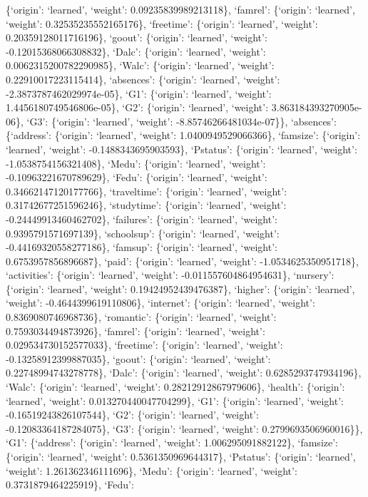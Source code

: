 \documentclass[
]{article}
\begin{document}
\{`origin': `learned', `weight': 0.09235839989213118\}, `famrel':
\{`origin': `learned', `weight': 0.32535235552165176\}, `freetime':
\{`origin': `learned', `weight': 0.20359128011716196\}, `goout':
\{`origin': `learned', `weight': -0.12015368066308832\}, `Dalc':
\{`origin': `learned', `weight': 0.0062315200782290985\}, `Walc':
\{`origin': `learned', `weight': 0.22910017223115414\}, `absences':
\{`origin': `learned', `weight': -2.3873787462029974e-05\}, `G1':
\{`origin': `learned', `weight': 1.4456180749546806e-05\}, `G2':
\{`origin': `learned', `weight': 3.863184393270905e-06\}, `G3':
\{`origin': `learned', `weight': -8.85746266481034e-07\}\}, `absences':
\{`address': \{`origin': `learned', `weight': 1.0400949529066366\},
`famsize': \{`origin': `learned', `weight': -0.1488343695903593\},
`Pstatus': \{`origin': `learned', `weight': -1.0538754156321408\},
`Medu': \{`origin': `learned', `weight': -0.10963221670789629\}, `Fedu':
\{`origin': `learned', `weight': 0.34662147120177766\}, `traveltime':
\{`origin': `learned', `weight': 0.31742677251596246\}, `studytime':
\{`origin': `learned', `weight': -0.24449913460462702\}, `failures':
\{`origin': `learned', `weight': 0.9395791571697139\}, `schoolsup':
\{`origin': `learned', `weight': -0.44169320558277186\}, `famsup':
\{`origin': `learned', `weight': 0.6753957856896687\}, `paid':
\{`origin': `learned', `weight': -1.0534625350951718\}, `activities':
\{`origin': `learned', `weight': -0.011557604864954631\}, `nursery':
\{`origin': `learned', `weight': 0.19424952439476387\}, `higher':
\{`origin': `learned', `weight': -0.4644399619110806\}, `internet':
\{`origin': `learned', `weight': 0.8369080746968736\}, `romantic':
\{`origin': `learned', `weight': 0.7593034494873926\}, `famrel':
\{`origin': `learned', `weight': 0.029534730152577033\}, `freetime':
\{`origin': `learned', `weight': -0.13258912399887035\}, `goout':
\{`origin': `learned', `weight': 0.22748994743278778\}, `Dalc':
\{`origin': `learned', `weight': 0.6285293747934196\}, `Walc':
\{`origin': `learned', `weight': 0.28212912867979606\}, `health':
\{`origin': `learned', `weight': 0.013270440047704299\}, `G1':
\{`origin': `learned', `weight': -0.16519243826107544\}, `G2':
\{`origin': `learned', `weight': -0.12083364187284075\}, `G3':
\{`origin': `learned', `weight': 0.2799693506960016\}\}, `G1':
\{`address': \{`origin': `learned', `weight': 1.006295091882122\},
`famsize': \{`origin': `learned', `weight': 0.5361350969644317\},
`Pstatus': \{`origin': `learned', `weight': 1.261362346111696\}, `Medu':
\{`origin': `learned', `weight': 0.3731879464225919\}, `Fedu':
\end{document}
